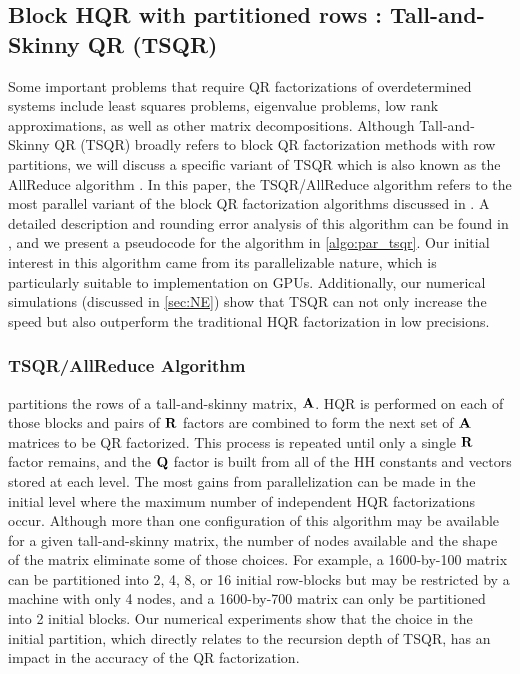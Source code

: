 \subsection{Block HQR with partitioned rows : Tall-and-Skinny QR (TSQR)}\label{sec:TSQR}
Some important problems that require QR factorizations of overdetermined systems include least squares problems, eigenvalue problems, low rank approximations, as well as other matrix decompositions.
Although Tall-and-Skinny QR (TSQR) broadly refers to block QR factorization methods with row partitions, we will discuss a specific variant of TSQR which is also known as the AllReduce algorithm \cite{Mori2012}.
In this paper, the TSQR/AllReduce algorithm refers to the most parallel variant of the block QR factorization algorithms discussed in \cite{Demmel2012}.
A detailed description and rounding error analysis of this algorithm can be found in \cite{Mori2012}, and we present a pseudocode for the algorithm in \cref{algo:par_tsqr}.
Our initial interest in this algorithm came from its parallelizable nature, which is particularly suitable to implementation on GPUs. 
Additionally, our numerical simulations (discussed in \cref{sec:NE}) show that TSQR can not only increase the speed but also outperform the traditional HQR factorization in low precisions.
\subsubsection{TSQR/AllReduce Algorithm}
 partitions the rows of a tall-and-skinny matrix, $\mathbf{A}$. 
HQR is performed on each of those blocks and pairs of $\mathbf{R}$ factors are combined to form the next set of $\mathbf{A}$ matrices to be QR factorized. 
This process is repeated until only a single $\mathbf{R}$ factor remains, and the $\mathbf{Q}$ factor is built from all of the HH constants and vectors stored at each level.
The most gains from parallelization can be made in the initial level where the maximum number of independent HQR factorizations occur. 
Although more than one configuration of this algorithm may be available for a given tall-and-skinny matrix, the number of nodes available and the shape of the matrix eliminate some of those choices. 
For example, a 1600-by-100 matrix can be partitioned into 2, 4, 8, or 16 initial row-blocks but may be restricted by a machine with only 4 nodes, and a 1600-by-700 matrix can only be partitioned into 2 initial blocks.
Our numerical experiments show that the choice in the initial partition, which directly relates to the recursion depth of TSQR, has an impact in the accuracy of the QR factorization. \par

